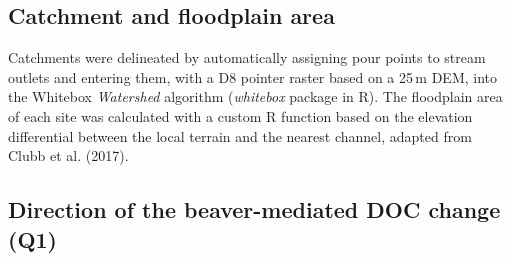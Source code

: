 \documentclass[11pt,a4paper]{article}
\begin{document}
\subsection*{Catchment and floodplain area}

Catchments were delineated by automatically assigning pour points to stream outlets and entering them, with a D8 pointer raster based on a 25\,m DEM, into the Whitebox \emph{Watershed} algorithm (\emph{whitebox} package in R). The floodplain area of each site was calculated with a custom R function based on the elevation differential between the local terrain and the nearest channel, adapted from Clubb et al. (2017).

\subsection*{Direction of the beaver-mediated DOC change (Q1)}
\end{document}
